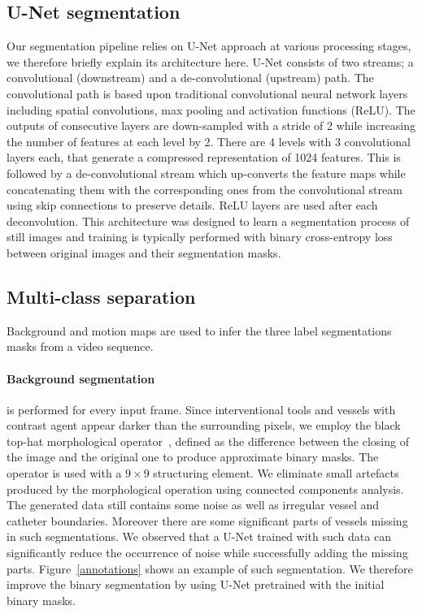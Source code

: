\documentclass{bmvc2k}
\begin{document}
\subsection{U-Net segmentation \label{UNET}} 
Our segmentation pipeline relies on U-Net approach \cite{unet} at various processing stages, we therefore briefly explain its architecture here.
U-Net consists of two streams; a convolutional (downstream) and a de-convolutional (upstream) path. The convolutional path is based upon traditional convolutional neural network layers including spatial convolutions, max pooling and activation functions (ReLU). The outputs of consecutive layers are down-sampled with a stride of 2 while increasing the number of features at each level by 2. There are 4 levels  with 3 convolutional layers each, that generate a compressed representation of 1024 features. This is followed by a de-convolutional stream  which up-converts the feature maps while concatenating them with the corresponding ones from the convolutional stream using skip connections to preserve details. ReLU layers are used after each deconvolution. This architecture was designed to learn a segmentation process of still images and training is typically performed with binary cross-entropy loss  between original images and their segmentation masks.




\subsection{Multi-class separation \label{PREPROC}} 
Background and motion maps are used to infer the three label segmentations masks from a video sequence.
\paragraph{Background segmentation}is performed for every  input frame. Since interventional tools and vessels with contrast agent appear darker than the surrounding pixels, we employ the black top-hat morphological operator~\cite{blackhat_reference}, defined as the difference between the closing of the image and the original one to produce approximate binary masks. The operator is used with a $9\times9$ structuring element. We eliminate small artefacts produced by the morphological operation using connected components analysis. 
The generated data still contains some noise as well as irregular vessel and catheter boundaries. Moreover there are some significant parts of vessels missing in such segmentations. We observed that a U-Net trained with such data can significantly reduce the occurrence of noise while successfully adding the missing parts. Figure~\ref{annotations}  shows an example of such segmentation.
We therefore improve the binary segmentation by using U-Net pretrained with the initial binary masks. 
\end{document}
